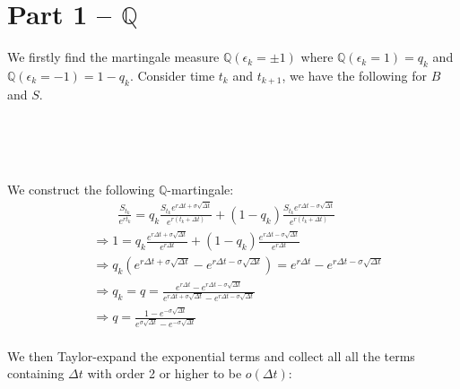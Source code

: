 \documentclass[12pt, letterpaper]{article}
\begin{document}
\section*{Part 1 -- $\mathbb{Q}$}
We firstly find the martingale measure $\mathbb{Q}(\epsilon_k = \pm 1)$ where $\mathbb{Q}(\epsilon_k =1) = q_k$ and $\mathbb{Q}(\epsilon_k =-1) = 1-q_k$. Consider 
time $t_k$ and $t_{k+1}$, we have the following for $B$ and $S$. \\ \\ 
\\
\\
We construct the following $\mathbb{Q}$-martingale:
\begin{align*}
&\qquad \frac{S_{t_k}}{e^{rt_k}} = q_k\frac{S_{t_k}e^{r\Delta t + \sigma \sqrt{\Delta t}}}{e^{r(t_k+\Delta t)}} + (1-q_k)\frac{S_{t_k}e^{r\Delta t - \sigma \sqrt{\Delta t}}}{e^{r(t_k+\Delta t)}}\\
&\Rightarrow 1 = q_k\frac{e^{r\Delta t + \sigma \sqrt{\Delta t}}}{e^{r\Delta t}} + (1-q_k) \frac{e^{r\Delta t - \sigma \sqrt{\Delta t}}}{e^{r\Delta t}} \\
&\Rightarrow q_k(e^{r\Delta t + \sigma \sqrt{\Delta t}} - e^{r\Delta t - \sigma \sqrt{\Delta t}}) = e^{r\Delta t} - e^{r\Delta t - \sigma \sqrt{\Delta t}} \\
&\Rightarrow q_k = q = \frac{e^{r\Delta t} - e^{r\Delta t - \sigma \sqrt{\Delta t}}}{e^{r\Delta t + \sigma \sqrt{\Delta t}} - e^{r\Delta t - \sigma \sqrt{\Delta t}}} \tag*{As $q_k$ does not depend on $k$} \\
& \Rightarrow q = \frac{1-e^{ - \sigma \sqrt{\Delta t}}}{e^{  \sigma \sqrt{\Delta t}}-e^{ - \sigma \sqrt{\Delta t}}}
\end{align*} 
\\
We then Taylor-expand the exponential terms and collect all all the terms containing $\Delta t$ with order 2 or higher to be $o(\Delta t)$:
\end{document}
